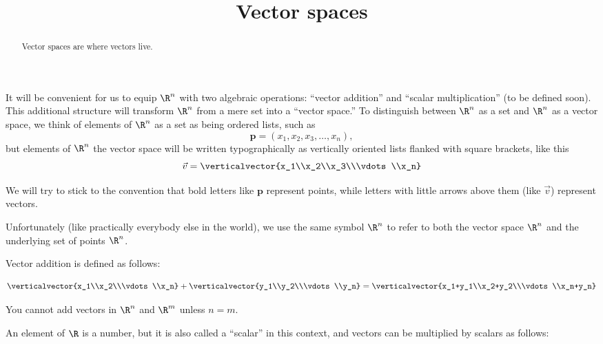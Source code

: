 \documentclass{ximera}
\title{Vector spaces}
\begin{document}
\begin{abstract}
  Vector spaces are where vectors live.
\end{abstract}
\maketitle

It will be convenient for us to equip $\R^n$ with two algebraic
operations: ``vector addition'' and ``scalar multiplication'' (to be
defined soon).  This additional structure will transform $\R^n$ from a
mere set into a ``vector space.''  To distinguish between $\R^n$ as a
set and $\R^n$ as a vector space, we think of elements of $\R^n$ as a
set as being ordered lists, such as
\[
\mathbf{p} = (x_1,x_2,x_3,\dots,x_n),
\]
but elements of $\R^n$ the vector space will be written
typographically as vertically oriented lists flanked with square
brackets, like this
\[ 
\vec{v}= \verticalvector{x_1\\x_2\\x_3\\\vdots\\x_n}
\]
 
We will try to stick to the convention that bold letters like $\mathbf{p}$ represent points, while letters with little arrows above them (like $\vec{v}$) represent vectors. 

Unfortunately (like practically everybody else in the world), we use
the same symbol $\R^n$ to refer to both the vector space $\R^n$ and
the underlying set of points $\R^n$.
 
Vector addition is defined as follows:
 
\[\verticalvector{x_1\\x_2\\\vdots\\x_n} +\verticalvector{y_1\\y_2\\\vdots\\y_n}=\verticalvector{x_1+y_1\\x_2+y_2\\\vdots\\x_n+y_n}\]

\begin{warning}
  You cannot add vectors in $\R^n$ and $\R^m$ unless $n = m$.
\end{warning}

An element of $\R$ is a number, but it is also called a ``scalar'' in this context, and vectors can be multiplied by scalars as follows:
	
\end{document}
